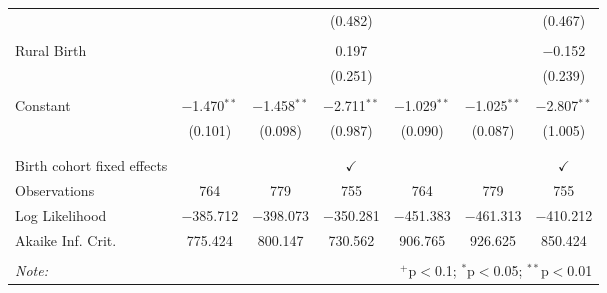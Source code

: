 \begin{table}[!htbp]
\begin{tabular}{@{\extracolsep{5pt}}lcccccc}
  &  &  & (0.482) &  &  & (0.467) \\ 
  & & & & & & \\ 
 Rural Birth &  &  & 0.197 &  &  & $-$0.152 \\ 
  &  &  & (0.251) &  &  & (0.239) \\ 
  & & & & & & \\ 
 Constant & $-$1.470$^{**}$ & $-$1.458$^{**}$ & $-$2.711$^{**}$ & $-$1.029$^{**}$ & $-$1.025$^{**}$ & $-$2.807$^{**}$ \\ 
  & (0.101) & (0.098) & (0.987) & (0.090) & (0.087) & (1.005) \\ 
  & & & & & & \\ 
\hline \\[-1.8ex] 
Birth cohort fixed effects &  &  & $\checkmark$ &  &  & $\checkmark$ \\ 
Observations & 764 & 779 & 755 & 764 & 779 & 755 \\ 
Log Likelihood & $-$385.712 & $-$398.073 & $-$350.281 & $-$451.383 & $-$461.313 & $-$410.212 \\ 
Akaike Inf. Crit. & 775.424 & 800.147 & 730.562 & 906.765 & 926.625 & 850.424 \\ 
\hline 
\hline \\[-1.8ex] 
\textit{Note:}  & \multicolumn{6}{r}{$^{+}$p$<$0.1; $^{*}$p$<$0.05; $^{**}$p$<$0.01}} \\ 
\end{tabular} 
\end{table} 
